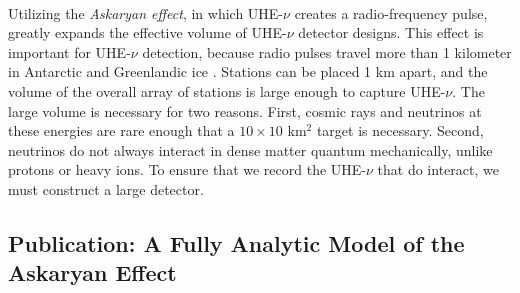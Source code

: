 \documentclass[../../../main.tex]{subfiles}
\begin{document}
\\
\vspace{0.15cm}
Utilizing the \textit{Askaryan effect}, in which UHE-$\nu$ creates a radio-frequency pulse, greatly expands the effective volume of UHE-$\nu$ detector designs.  This effect is important for UHE-$\nu$ detection, because radio pulses travel more than 1 kilometer in Antarctic and Greenlandic ice \cite{10.3189/2015jog14j214,10.3189/2015jog15j057,10.1002/2015rs005849,10.1016/j.astropartphys.2011.11.010}.  Stations can be placed 1 km apart, and the volume of the overall array of stations is large enough to capture UHE-$\nu$.  The large volume is necessary for two reasons.  First, cosmic rays and neutrinos at these energies are rare enough that a $10 \times 10$ km$^2$ target is necessary.  Second, neutrinos do not always interact in dense matter quantum mechanically, unlike protons or heavy ions.  To ensure that we record the UHE-$\nu$ that do interact, we must construct a large detector.

\subsection{Publication: A Fully Analytic Model of the Askaryan Effect}
\end{document}
